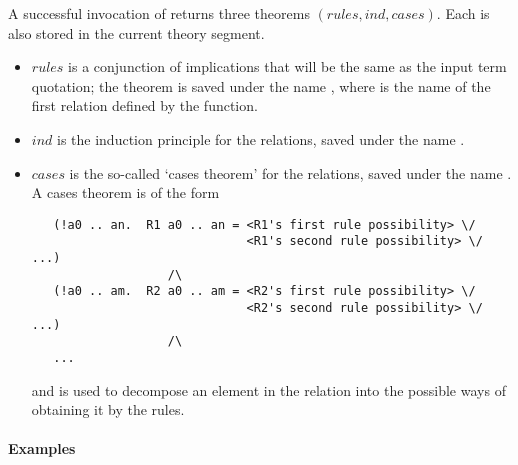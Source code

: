 A successful invocation of  returns three theorems
$(\mathit{rules},\mathit{ind},\mathit{cases})$. Each is also stored in
the current theory segment.
\begin{itemize}
\item $\mathit{rules}$ is a conjunction of implications
that will be the same as the input term quotation; the theorem is
saved under the name , where  is the name of the
first relation defined by the function.
\item $\mathit{ind}$ is the induction principle for the relations,
saved under the name .
\item $\mathit{cases}$ is the so-called `cases theorem' for the relations,
saved under the name . A cases theorem is of the form
%
\begin{hol}
\begin{verbatim}
   (!a0 .. an.  R1 a0 .. an = <R1's first rule possibility> \/
                              <R1's second rule possibility> \/ ...)
                   /\
   (!a0 .. am.  R2 a0 .. am = <R2's first rule possibility> \/
                              <R2's second rule possibility> \/ ...)
                   /\
   ...
\end{verbatim}
\end{hol}
%
and is used to decompose an element in the relation into the
possible ways of obtaining it by the rules.
\end{itemize}

\paragraph{Examples}

